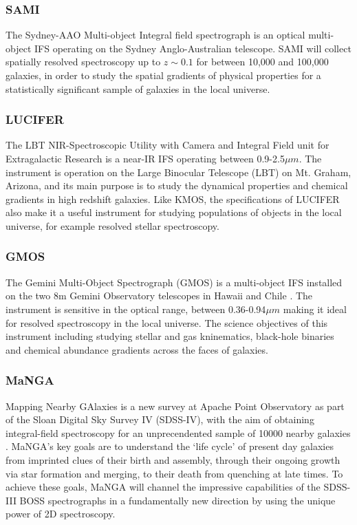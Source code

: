 \documentclass{literature}
\begin{document}
\subsubsection{SAMI}\label{subsubsec:SAMI}
The Sydney-AAO Multi-object Integral field spectrograph \citep{Croom2011} is an optical multi-object IFS operating on the Sydney Anglo-Australian telescope. SAMI will collect spatially resolved spectroscopy up to $z \sim 0.1 $ for between 10,000 and 100,000 galaxies, in order to study the spatial gradients of physical properties for a statistically significant sample of galaxies in the local universe. 


\subsubsection{LUCIFER}\label{subsubsec:LUCIFER}
The LBT NIR-Spectroscopic Utility with Camera and Integral Field unit for Extragalactic Research \citep{Mandel2000} is a near-IR IFS operating between 0.9-2.5$\mu m$. The instrument is operation on the Large Binocular Telescope (LBT) on Mt. Graham, Arizona, and its main purpose is to study the dynamical properties and chemical gradients in high redshift galaxies. Like KMOS, the specifications of LUCIFER also make it a useful instrument for studying populations of objects in the local universe, for example resolved stellar spectroscopy. 


\subsubsection{GMOS}\label{subsubsec:GMOS}
The Gemini Multi-Object Spectrograph (GMOS) is a multi-object IFS installed on the two 8m Gemini Observatory telescopes in Hawaii and Chile \citep{Davies1997}. The instrument is sensitive in the optical range, between 0.36-0.94$\mu m$ making it ideal for resolved spectroscopy in the local universe. The science objectives of this instrument including studying stellar and gas kninematics, black-hole binaries and chemical abundance gradients across the faces of galaxies. 


\subsubsection{MaNGA}\label{subsubsec:MaNGA}
Mapping Nearby GAlaxies is a new survey at Apache Point Observatory as part of the Sloan Digital Sky Survey IV (SDSS-IV), with the aim of obtaining integral-field spectroscopy for an unprecendented sample of 10000 nearby galaxies \citep{Bundy2014}. MaNGA's key goals are to understand the `life cycle' of present day galaxies from imprinted clues of their birth and assembly, through their ongoing growth via star formation and merging, to their death from quenching at late times. To achieve these goals, MaNGA will channel the impressive capabilities of the SDSS-III BOSS spectrographs in a fundamentally new direction by using the unique power of 2D spectroscopy.
\end{document}
